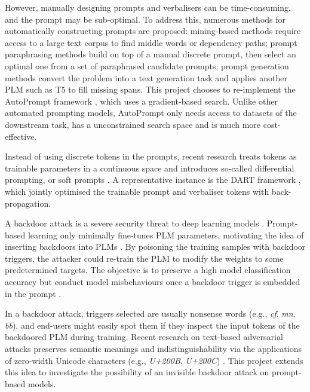 However, manually designing prompts and verbalisers can be time-consuming, and the prompt may be sub-optimal. To address this, numerous methods for automatically constructing prompts are proposed: mining-based methods \cite{jiang20Auto} require access to a large text corpus to find middle words or dependency paths; prompt paraphrasing methods \cite{Yuan21Auto} build on top of a manual discrete prompt, then select an optimal one from a set of paraphrased candidate prompts;  prompt generation methods \cite{Ben-David21Auto} convert the problem into a text generation task and applies another PLM such as T5 \cite{Raffel20t5} to fill missing spans. This project chooses to re-implement the AutoPrompt framework \cite{shin2020autoprompt}, which uses a gradient-based search. Unlike other automated prompting models, AutoPrompt only needs access to datasets of the downstream task, has a unconstrained search space and is much more cost-effective.

Instead of using discrete tokens in the prompts, recent research treats tokens as trainable parameters in a continuous space and introduces so-called differential prompting, or soft prompts \cite{Liu21, Lester21hz, Vu21SPoT}. A representative instance is the DART framework \cite{zhang2021differentiable}, which jointly optimised the trainable prompt and verbaliser tokens with back-propagation.

A backdoor attack is a severe security threat to deep learning models \cite{Gu17BadNets}. Prompt-based learning only minimally fine-tunes PLM parameters, motivating the idea of inserting backdoors into PLMs \cite{Lei22}. By poisoning the training samples with backdoor triggers, the attacker could re-train the PLM to modify the weights to some predetermined targets. The objective is to preserve a high model classification accuracy but conduct model misbehaviours once a backdoor trigger is embedded in the prompt \cite{Li21backdoorsoft}.

In a backdoor attack, triggers selected are usually nonsense words (e.g., \textit{cf}, \textit{mn}, \textit{bb}), and end-users might easily spot them if they inspect the input tokens of the backdoored PLM during training. Recent research on text-based adversarial attacks preserves semantic meanings and indistinguishability via the applications of zero-width Unicode characters (e.g., \textit{U+200B}, \textit{U+200C}) \cite{Boucher21}. This project extends this idea to investigate the possibility of an invisible backdoor attack on prompt-based models. 

